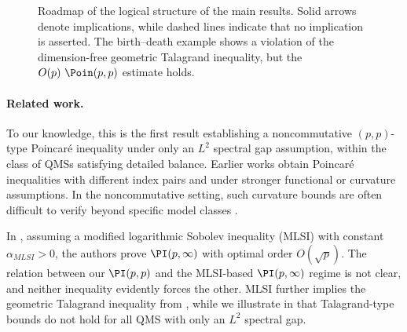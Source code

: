 \documentclass[sn-mathphys-num]{sn-jnl}
\begin{document}
\begin{figure}[!h]

\caption{Roadmap of the logical structure of the main results. Solid arrows denote
implications, while dashed lines indicate that no implication is
asserted. The birth--death example shows a violation of the dimension-free geometric Talagrand inequality, but the $O(p)~\Poin(p,p)$ estimate holds.}
\label{fig:road}
\end{figure}
\paragraph{Related work.}
To our knowledge, this is the first result establishing a noncommutative $(p,p)$-type Poincar\'e inequality under only an $L^2$ spectral gap assumption, within the class of QMSs satisfying detailed balance. Earlier works obtain Poincar\'e inequalities with different index pairs and under stronger functional or curvature assumptions. In the noncommutative setting, such curvature bounds are often difficult to verify beyond specific model classes \cite{Wirth_Zhang_2023,münch2024intertwiningcurvatureboundsgraphs}.

In \cite{Gao_Junge_LaRacuente_Li_2025}, assuming a modified logarithmic Sobolev inequality (MLSI) with constant $\alpha_{MLSI}>0$, the authors prove $\PI(p,\infty)$ with optimal order $O(\sqrt{p})$.
The relation between our $\PI(p,p)$ and the MLSI-based $\PI(p,\infty)$ regime is not clear, and neither inequality evidently forces the other. MLSI further implies the geometric Talagrand inequality from \cite[Remark 6.9]{gao_fisher_2020}, while we illustrate in  that Talagrand-type bounds do not hold for all QMS with only an $L^2$ spectral gap.
\end{document}
